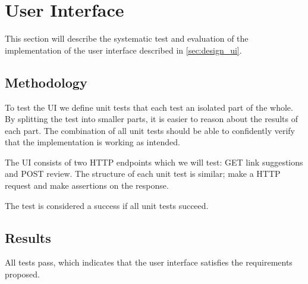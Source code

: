 \section{User Interface}
This section will describe the systematic test and evaluation of the implementation of the user interface described in \cref{sec:design_ui}.

\subsection{Methodology}
To test the UI we define unit tests that each test an isolated part of the whole. By splitting the test into smaller parts, it is easier to reason about the results of each part. The combination of all unit tests should be able to confidently verify that the implementation is working as intended.

The UI consists of two HTTP endpoints which we will test: GET link suggestions and POST review. The structure of each unit test is similar; make a HTTP request and make assertions on the response. 

The test is considered a success if all unit tests succeed.


\subsection{Results}
All tests pass, which indicates that the user interface satisfies the requirements proposed.  
